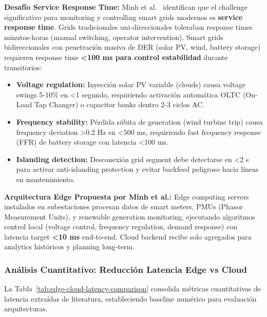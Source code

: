 \textbf{Desafío Service Response Time:} Minh et al.~\cite{minhEdgeComputingIoTEnabled2022} identifican que el challenge significativo para monitoring y controlling smart grids modernos es \textbf{service response time}. Grids tradicionales uni-direccionales toleraban response times minutos-horas (manual switching, operator intervention). Smart grids bidireccionales con penetración masiva de DER (solar PV, wind, battery storage) requieren response time \textbf{<100 ms para control estabilidad} durante transitorios:

\begin{itemize}
\item \textbf{Voltage regulation:} Inyección solar PV variable (clouds) causa voltage swings 5-10\% en <1 segundo, requiriendo activación automática OLTC (On-Load Tap Changer) o capacitor banks dentro 2-3 ciclos AC.
\item \textbf{Frequency stability:} Pérdida súbita de generation (wind turbine trip) causa frequency deviation >0.2 Hz en <500 ms, requiriendo fast frequency response (FFR) de battery storage con latencia <100 ms.
\item \textbf{Islanding detection:} Desconexión grid segment debe detectarse en <2 s para activar anti-islanding protection y evitar backfeed peligroso hacia líneas en mantenimiento.
\end{itemize}

\textbf{Arquitectura Edge Propuesta por Minh et al.:} Edge computing servers instalados en subestaciones procesan datos de smart meters, PMUs (Phasor Measurement Units), y renewable generation monitoring, ejecutando algoritmos control local (voltage control, frequency regulation, demand response) con latencia target \textbf{<10 ms} end-to-end. Cloud backend recibe solo agregados para analytics históricos y planning long-term.

\subsubsection{Análisis Cuantitativo: Reducción Latencia Edge vs Cloud}

La Tabla~\ref{tab:edge-cloud-latency-comparison} consolida métricas cuantitativas de latencia extraídas de literatura, estableciendo baseline numérico para evaluación arquitecturas.

